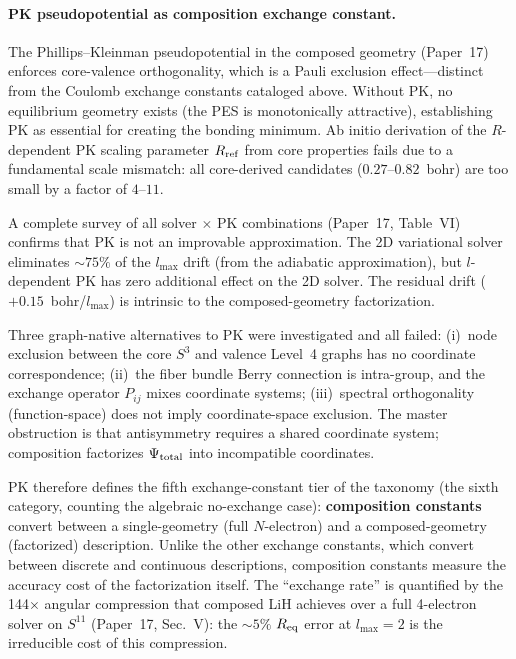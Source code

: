 \documentclass[aps,pra,twocolumn,superscriptaddress,longbibliography]{revtex4-2}
\begin{document}
\paragraph{PK pseudopotential as composition exchange constant.}
The Phillips--Kleinman pseudopotential in the composed geometry
(Paper~17) enforces core-valence orthogonality, which is a
Pauli exclusion effect---distinct from the Coulomb exchange
constants cataloged above.  Without PK, no equilibrium
geometry exists (the PES is monotonically attractive), establishing
PK as essential for creating the bonding minimum.  Ab initio
derivation of the $R$-dependent PK scaling parameter $R_{\rm ref}$
from core properties fails due to a fundamental scale mismatch:
all core-derived candidates ($0.27$--$0.82$~bohr) are too small
by a factor of $4$--$11$.

A complete survey of all solver $\times$ PK combinations
(Paper~17, Table~VI) confirms that PK is not an improvable
approximation.  The 2D variational solver eliminates ${\sim}75\%$
of the $l_{\max}$ drift (from the adiabatic approximation), but
$l$-dependent PK has zero additional effect on the 2D solver.
The residual drift ($+0.15$~bohr/$l_{\max}$) is intrinsic to
the composed-geometry factorization.

Three graph-native alternatives to PK were investigated and all
failed: (i)~node exclusion between the core $S^3$ and valence
Level~4 graphs has no coordinate correspondence;
(ii)~the fiber bundle Berry connection is intra-group, and the
exchange operator $P_{ij}$ mixes coordinate systems;
(iii)~spectral orthogonality (function-space) does not imply
coordinate-space exclusion.  The master obstruction is that
antisymmetry requires a shared coordinate system; composition
factorizes $\Psi_{\rm total}$ into incompatible coordinates.

PK therefore defines the fifth exchange-constant tier of the taxonomy
(the sixth category, counting the algebraic no-exchange case):
\textbf{composition constants} convert between a single-geometry
(full $N$-electron) and a composed-geometry (factorized) description.
Unlike the other exchange constants, which convert between discrete
and continuous descriptions, composition constants measure the
accuracy cost of the factorization itself.  The ``exchange rate''
is quantified by the 144$\times$ angular compression that composed
LiH achieves over a full 4-electron solver on $S^{11}$
(Paper~17, Sec.~V): the ${\sim}5\%$ $R_{\rm eq}$ error at
$l_{\max} = 2$ is the irreducible cost of this compression.
\end{document}
